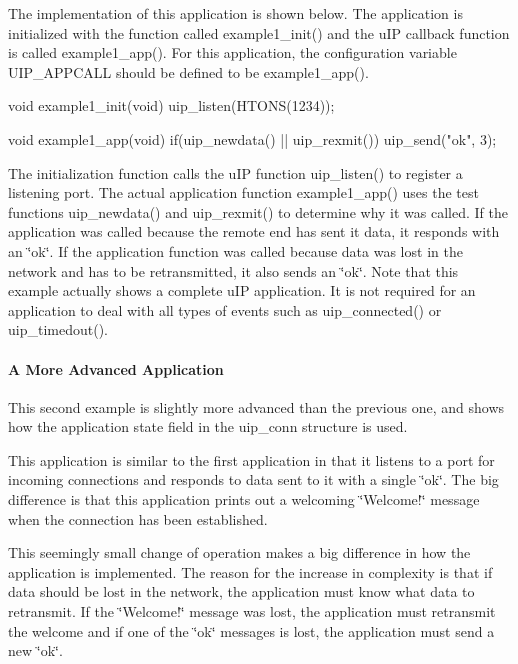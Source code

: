 \-The implementation of this application is shown below. \-The application is initialized with the function called example1\-\_\-init() and the u\-I\-P callback function is called example1\-\_\-app(). \-For this application, the configuration variable \-U\-I\-P\-\_\-\-A\-P\-P\-C\-A\-L\-L should be defined to be example1\-\_\-app().


\begin{DoxyCode}
void example1_init(void) {
   uip_listen(HTONS(1234));
}

void example1_app(void) {
   if(uip_newdata() || uip_rexmit()) {
      uip_send("ok\n", 3);
   }
}
\end{DoxyCode}


\-The initialization function calls the u\-I\-P function uip\-\_\-listen() to register a listening port. \-The actual application function example1\-\_\-app() uses the test functions uip\-\_\-newdata() and uip\-\_\-rexmit() to determine why it was called. \-If the application was called because the remote end has sent it data, it responds with an \char`\"{}ok\char`\"{}. \-If the application function was called because data was lost in the network and has to be retransmitted, it also sends an \char`\"{}ok\char`\"{}. \-Note that this example actually shows a complete u\-I\-P application. \-It is not required for an application to deal with all types of events such as uip\-\_\-connected() or uip\-\_\-timedout().\hypertarget{a00060_example2}{}\paragraph{\-A More Advanced Application}\label{a00060_example2}
\-This second example is slightly more advanced than the previous one, and shows how the application state field in the uip\-\_\-conn structure is used.

\-This application is similar to the first application in that it listens to a port for incoming connections and responds to data sent to it with a single \char`\"{}ok\char`\"{}. \-The big difference is that this application prints out a welcoming \char`\"{}\-Welcome!\char`\"{} message when the connection has been established.

\-This seemingly small change of operation makes a big difference in how the application is implemented. \-The reason for the increase in complexity is that if data should be lost in the network, the application must know what data to retransmit. \-If the \char`\"{}\-Welcome!\char`\"{} message was lost, the application must retransmit the welcome and if one of the \char`\"{}ok\char`\"{} messages is lost, the application must send a new \char`\"{}ok\char`\"{}.

